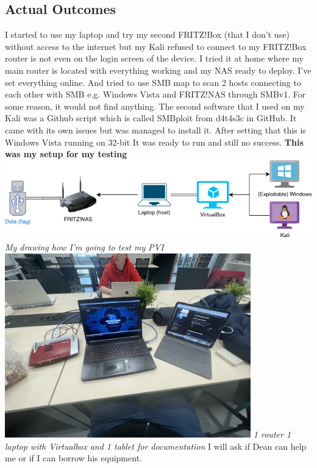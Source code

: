 \documentclass[12pt, letterpaper]{article}
\begin{document}
\subsection{Actual Outcomes}
I started to use my laptop and try my second FRITZ!Box (that I don't use) without access to the internet but my Kali refused to connect to my FRITZ!Box router is not even on the login screen of the device.
\hfill\break
\hfill\break
I tried it at home where my main router is located with everything working and my NAS ready to deploy. I've set everything online. And tried to use SMB map to scan 2 hosts connecting to each other with SMB e.g. Windows Vista and FRITZ!NAS through SMBv1. For some reason, it would not find anything. The second software that I used on my Kali was a Github script which is called SMBploit from d4t4s3c in GitHub. It came with its own issues but was managed to install it. After setting that this is Windows Vista running on 32-bit It was ready to run and still no success.
\newpage
\textbf{This was my setup for my testing}
\hfill\break
\includegraphics[width=1\textwidth]{fotos/PVI/PVI drawing.drawio.png}
\break
\emph{My drawing how I'm going to test my PVI}
\hfill\break
\hfill\break
\includegraphics[width=0.8\textwidth]{fotos/PVI/Demo fail.jpeg}
\break
\emph{1 router 1 laptop with Virtualbox and 1 tablet for documentation}
\hfill\break
\hfill\break
I will ask if Dean can help me or if I can borrow his equipment.
\end{document}
